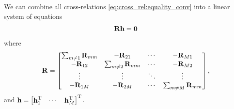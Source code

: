 \documentclass{article}
\newcommand{\h}{\mtxb{h}}
\newcommand{\R}{\mtxb{R}}
\begin{document}
We can combine all cross-relations \eqref{eq:cross_rel:equality_conv} into a linear system of equations
\begin{equation}
    \R \h = \bm{0} \label{eq:cross_rel:null_space}\\
\end{equation}
where 
\begin{equation}
    \R = \begin{bmatrix}
        \sum_{m \neq 1} \R_{mm} & -\R_{21} & \cdots & -\R_{M1}\\
        -\R_{12} & \sum_{m \neq 2} \R_{mm} & \cdots & -\R_{M2}\\
        \vdots & \vdots & \ddots & \vdots\\
        -\R_{1M} & -\R_{2M} & \cdots & \sum_{m \neq M} \R_{mm}\\
    \end{bmatrix},\label{eq:cross_rel:data_matrix}
\end{equation}
and \(\h = \begin{bmatrix}
    \h_1^\T & \cdots & \h_M^\T
\end{bmatrix}^\T\).

\end{document}
